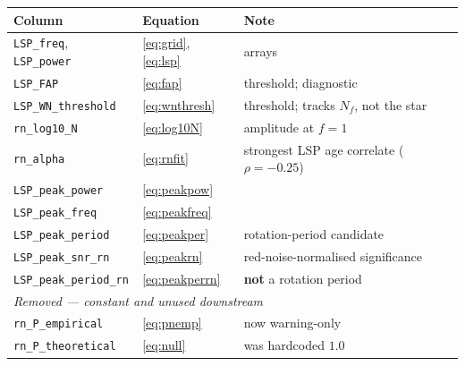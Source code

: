 \documentclass[11pt]{article}
\begin{document}
\begin{table}[htbp]
\centering
\small
\begin{tabular}{lll}
\toprule
Column & Equation & Note \\
\midrule
\texttt{LSP\_freq}, \texttt{LSP\_power} & \eqref{eq:grid}, \eqref{eq:lsp} & arrays \\
\texttt{LSP\_FAP}                & \eqref{eq:fap}       & threshold; diagnostic \\
\texttt{LSP\_WN\_threshold}      & \eqref{eq:wnthresh}  & threshold; tracks $N_f$, not the star \\
\texttt{rn\_log10\_N}            & \eqref{eq:log10N}    & amplitude at $f = 1$ \\
\texttt{rn\_alpha}               & \eqref{eq:rnfit}     & strongest LSP age correlate ($\rho = -0.25$) \\
\texttt{LSP\_peak\_power}        & \eqref{eq:peakpow}   & \\
\texttt{LSP\_peak\_freq}         & \eqref{eq:peakfreq}  & \\
\texttt{LSP\_peak\_period}       & \eqref{eq:peakper}   & rotation-period candidate \\
\texttt{LSP\_peak\_snr\_rn}      & \eqref{eq:peakrn}    & red-noise-normalised significance \\
\texttt{LSP\_peak\_period\_rn}   & \eqref{eq:peakperrn} & \textbf{not} a rotation period \\
\midrule
\multicolumn{3}{l}{\emph{Removed --- constant and unused downstream}}\\
\texttt{rn\_P\_empirical}        & \eqref{eq:pnemp}     & now warning-only \\
\texttt{rn\_P\_theoretical}      & \eqref{eq:null}      & was hardcoded $1.0$ \\
\bottomrule
\end{tabular}
\end{table}
\end{document}
